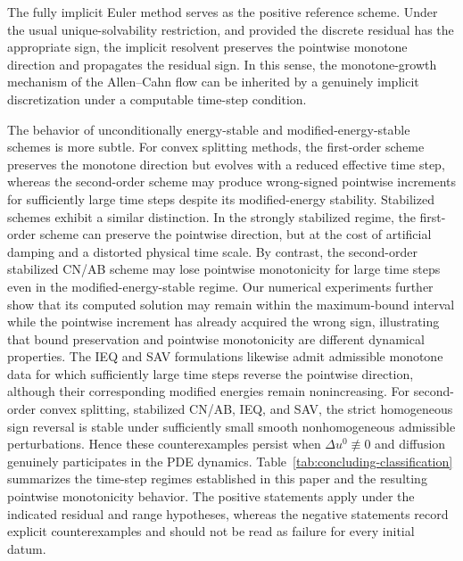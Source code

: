 \documentclass[final, 3p, times]{elsarticle}%
\begin{document}
The fully implicit Euler method serves as the positive reference scheme. Under the usual unique-solvability restriction, and provided the discrete residual has the appropriate sign, the implicit resolvent preserves the pointwise monotone direction and propagates the residual sign. In this sense, the monotone-growth mechanism of the Allen--Cahn flow can be inherited by a genuinely implicit discretization under a computable time-step condition.

The behavior of unconditionally energy-stable and
modified-energy-stable schemes is more subtle. For convex splitting
methods, the first-order scheme preserves the monotone direction but
evolves with a reduced effective time step, whereas the second-order
scheme may produce wrong-signed pointwise increments for sufficiently
large time steps despite its modified-energy stability. Stabilized
schemes exhibit a similar distinction. In the strongly stabilized
regime, the first-order scheme can preserve the pointwise direction,
but at the cost of artificial damping and a distorted physical time
scale. By contrast, the second-order stabilized CN/AB scheme may lose
pointwise monotonicity for large time steps even in the
modified-energy-stable regime. Our numerical experiments further show
that its computed solution may remain within the maximum-bound interval
while the pointwise increment has already acquired the wrong sign,
illustrating that bound preservation and pointwise monotonicity are
different dynamical properties. The IEQ and SAV formulations likewise
admit admissible monotone data for which sufficiently large time steps
reverse the pointwise direction, although their corresponding modified
energies remain nonincreasing. For second-order convex splitting,
stabilized CN/AB, IEQ, and SAV, the strict homogeneous sign reversal is
stable under sufficiently small smooth nonhomogeneous admissible
perturbations. Hence these counterexamples persist when
\(\Delta u^0\not\equiv0\) and diffusion genuinely participates in the
PDE dynamics. Table~\ref{tab:concluding-classification}
summarizes the time-step regimes established in this paper and the
resulting pointwise monotonicity behavior. The positive statements apply
under the indicated residual and range hypotheses, whereas the negative
statements record explicit counterexamples and should not be read as failure
for every initial datum.
\end{document}
